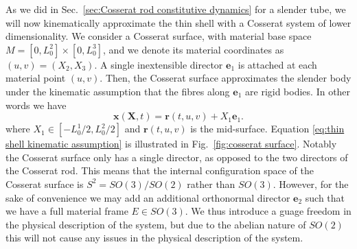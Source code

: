 As we did in Sec.~\ref{sec:Cosserat rod constitutive dynamics} for a slender tube, we will now kinematically approximate the thin shell with a Cosserat system of lower dimensionality. We consider a Cosserat surface, with material base space $M = [0, L_0^2] \times [0, L_0^3]$, and we denote its material coordinates as $(u, v) = (X_2, X_3)$. A single inextensible director $\mathbf{e}_1$ is attached at each material point $(u,v)$. Then, the Cosserat surface approximates the slender body under the kinematic assumption that the fibres along $\mathbf{e}_1$ are rigid bodies. In other words we have
\begin{equation} \label{eq:thin shell kinematic assumption}
\mathbf{x}(\mathbf{X}, t) = \mathbf{r}(t, u, v) + X_1 \mathbf{e}_1.
\end{equation}
where $X_1 \in [-L_0^1/2, L_0^2/2]$ and $\mathbf{r}(t,u,v)$ is the mid-surface. Equation \ref{eq:thin shell kinematic assumption} is illustrated in Fig.~\ref{fig:cosserat surface}. Notably the Cosserat surface only has a single director, as opposed to the two directors of the Cosserat rod. This means that the internal configuration space of the Cosserat surface is $S^2 = SO(3) / SO(2)$ rather than $SO(3)$. However, for the sake of convenience we may add an additional orthonormal director $\mathbf{e}_2$ such that we have a full material frame $E \in SO(3)$. We thus introduce a guage freedom in the physical description of the system, but due to the abelian nature of $SO(2)$ this will not cause any issues in the physical description of the system.

